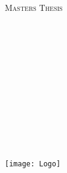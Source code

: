 \documentclass[
12pt, %
english, %
onehalfspacing, %
headsepline, %
]{MastersDoctoralThesis} %
\author{Morten \textsc{Mjelva}} %
\begin{document}
\frontmatter %

\pagestyle{plain} %


\begin{titlepage}
\begin{center}

\vspace*{.06\textheight}
{\scshape\Large \univname\par}\vspace{1.5cm} %
\textsc{\Large Masters Thesis}\\[0.5cm] %

\HRule \\[0.4cm] %
{\huge \bfseries \ttitle\par}\vspace{0.4cm} %
\HRule \\[1.5cm] %

\begin{minipage}[t]{0.4\textwidth}
\begin{flushleft} \large
{}\\
\href{http://www.johnsmith.com}{\authorname} %
\end{flushleft}
\end{minipage}
\begin{minipage}[t]{0.4\textwidth}
\begin{flushright} \large
{} \\
\href{http://www.ntnu.edu/employees/sverre.hendseth}{\supname} %
\end{flushright}
\end{minipage}\\[3cm]

\vfill

\large {}\\[0.3cm] %
\\[0.4cm]
\deptname\\[2.6cm] %

\vfill

\texttt{[image: Logo]} %

\vfill
\end{center}
\end{titlepage}
\end{document}
